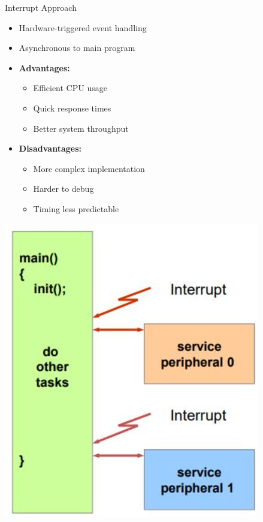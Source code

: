 \begin{concept}{Interrupt Approach}

  \begin{minipage}{0.5\linewidth}
\begin{itemize}
  \item Hardware-triggered event handling
  \item Asynchronous to main program
  \item \textbf{Advantages:}
    \begin{itemize}
      \item Efficient CPU usage
      \item Quick response times
      \item Better system throughput
    \end{itemize}
  \item \textbf{Disadvantages:}
    \begin{itemize}
      \item More complex implementation
      \item Harder to debug
      \item Timing less predictable
    \end{itemize}
\end{itemize}
\end{minipage}
\begin{minipage}{0.5\linewidth}
\includegraphics[width=\linewidth]{images/2024_12_29_79e6b22f503fb7b4f718g-11(2)}
\end{minipage}
\end{concept}

